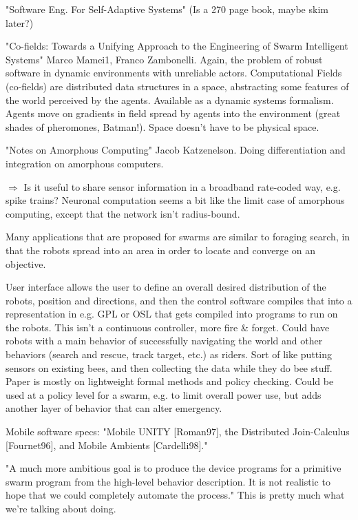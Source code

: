 \documentclass[]{article}
\begin{document}
"Software Eng. For Self-Adaptive Systems" (Is a 270 page book, maybe skim later?)

"Co-fields: Towards a Unifying Approach to the Engineering of Swarm Intelligent Systems" \cite{mamei2003co} Marco Mamei1, Franco Zambonelli. Again, the problem of robust software in dynamic environments with unreliable actors. Computational Fields (co-fields) are distributed data structures in a space, abstracting some features of the world perceived by the agents. Available as a dynamic systems formalism. Agents move on gradients in field spread by agents into the environment (great shades of pheromones, Batman!). Space doesn't have to be physical space. 


"Notes on Amorphous Computing" Jacob Katzenelson. \cite{katzenelson2000notes} Doing differentiation and integration on amorphous computers. 

$\Rightarrow$ Is it useful to share sensor information in a broadband rate-coded way, e.g. spike trains? Neuronal computation seems a bit like the limit case of amorphous computing, except that the network isn't radius-bound. 

Many applications that are proposed for swarms are similar to foraging search, in that the robots spread into an area in order to locate and converge on an objective. 

User interface allows the user to define an overall desired distribution of the robots, position and directions, and then the control software compiles that into a representation in e.g. GPL or OSL that gets compiled into programs to run on the robots. This isn't a continuous controller, more fire \& forget. Could have robots with a main behavior of successfully navigating the world and other behaviors (search and rescue, track target, etc.) as riders. Sort of like putting sensors on existing bees, and then collecting the data while they do bee stuff. Paper is mostly on lightweight formal methods and policy checking. Could be used at a policy level for a swarm, e.g. to limit overall power use, but adds another layer of behavior that can alter emergency. 

Mobile software specs: "Mobile UNITY [Roman97], the Distributed Join-Calculus [Fournet96], and Mobile Ambients [Cardelli98]."

"A much more ambitious goal is to produce the device programs for a primitive swarm program from the high-level behavior description. It is not realistic to hope that we could completely automate the process." This is pretty much what we're talking about doing. 
\end{document}
